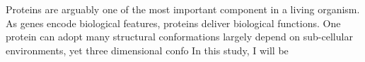 Proteins are arguably one of the most important component in a living organism. As genes encode biological features, proteins deliver biological functions. One protein can adopt many structural conformations largely depend on sub-cellular environments, yet three dimensional confo    In this study, I will be 